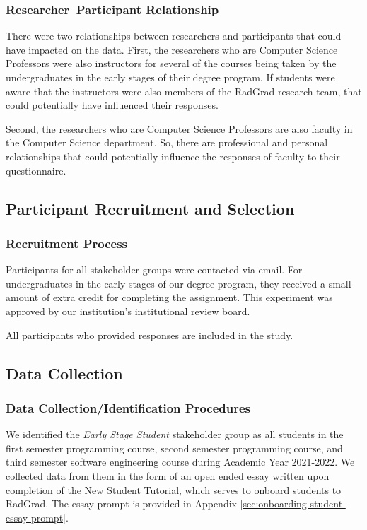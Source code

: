 \documentclass[acmsmall,nonacm]{acmart}
\begin{document}
\subsubsection{Researcher–Participant Relationship}

There were two relationships between researchers and participants that could have impacted on the data. First, the researchers who are Computer Science Professors were also instructors for several of the courses being taken by the undergraduates in the early stages of their degree program. If students were aware that the instructors were also members of the RadGrad research team, that could potentially have influenced their responses.

Second, the researchers who are Computer Science Professors are also faculty in the Computer Science department. So, there are professional and personal relationships that could potentially influence the responses of faculty to their questionnaire.

\subsection{Participant Recruitment and Selection}
\subsubsection{Recruitment Process}

Participants for all stakeholder groups were contacted via email.  For undergraduates in the early stages of our degree program, they received a small amount of extra credit for completing the assignment.  This experiment was approved by our institution's institutional review board.

All participants who provided responses are included in the study.

\subsection{Data Collection}

\subsubsection{Data Collection/Identification Procedures}

We identified the {\em Early Stage Student} stakeholder group as all students in the first semester programming course, second semester programming course, and third semester software engineering course during Academic Year 2021-2022. We collected data from them in the form of an open ended essay written upon completion of the New Student Tutorial, which serves to onboard students to RadGrad. The essay prompt is provided in Appendix \ref{sec:onboarding-student-essay-prompt}.
\end{document}

